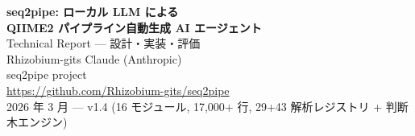 \documentclass[12pt, a4paper]{article}
\begin{document}
\begin{center}
  {\LARGE \textbf{seq2pipe: ローカル LLM による}}\\[4pt]
  {\LARGE \textbf{QIIME2 パイプライン自動生成 AI エージェント}}\\[8pt]
  {\normalsize Technical Report --- 設計・実装・評価}\\[12pt]
  {\normalsize Rhizobium-gits \quad Claude (Anthropic)}\\[4pt]
  {\small seq2pipe project}\\[2pt]
  {\small \url{https://github.com/Rhizobium-gits/seq2pipe}}\\[8pt]
  {\small 2026 年 3 月 --- v1.4 (16 モジュール, 17,000+ 行, 29+43 解析レジストリ + 判断木エンジン)}
\end{center}

\vspace{6mm}
\end{document}
